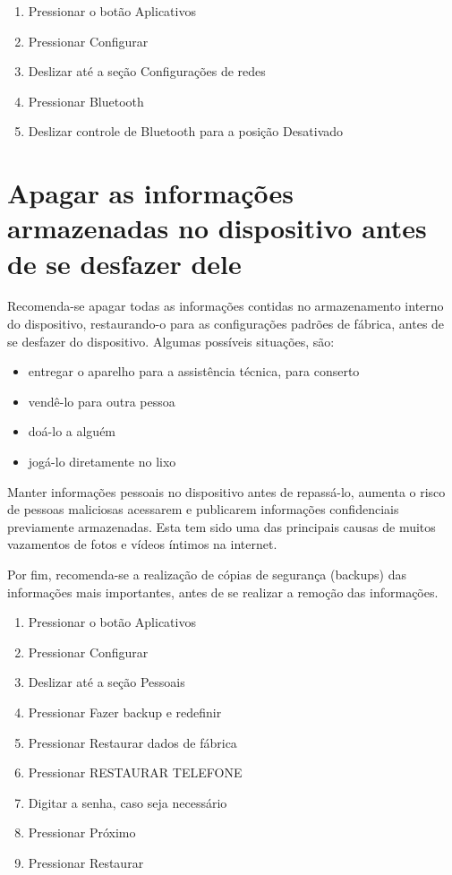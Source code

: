 \begin{enumerate}
\item Pressionar o bot\~ao Aplicativos
\item Pressionar Configurar
\item Deslizar at\'e a se\c c\~ao Configura\c c\~oes de redes
\item Pressionar Bluetooth
\item Deslizar controle de Bluetooth para a posi\c c\~ao Desativado
\end{enumerate}

\section{Apagar as informa\c c\~oes armazenadas no dispositivo antes de se desfazer dele}

Recomenda-se apagar todas as informa\c c\~oes contidas no armazenamento interno do dispositivo, restaurando-o para as configura\c c\~oes padr\~oes de f\'abrica, antes de se desfazer do dispositivo. Algumas poss\'iveis situa\c c\~oes, s\~ao:

\begin{itemize}
\item entregar o aparelho para a assist\^encia t\'ecnica, para conserto
\item vend\^e-lo para outra pessoa
\item do\'a-lo a algu\'em
\item jog\'a-lo diretamente no lixo
\end{itemize}

Manter informa\c c\~oes pessoais no dispositivo antes de repass\'a-lo, aumenta o risco de pessoas maliciosas acessarem e publicarem informa\c c\~oes confidenciais previamente armazenadas. Esta tem sido uma das principais causas de muitos vazamentos de fotos e v\'ideos \'intimos na internet. 

Por fim, recomenda-se a realiza\c c\~ao de c\'opias de seguran\c ca (backups) das informa\c c\~oes mais importantes, antes de se realizar a remo\c c\~ao das informa\c c\~oes.

\begin{enumerate}
\item Pressionar o bot\~ao Aplicativos
\item Pressionar Configurar
\item Deslizar at\'e a se\c c\~ao Pessoais
\item Pressionar Fazer backup e redefinir
\item Pressionar Restaurar dados de f\'abrica
\item Pressionar RESTAURAR TELEFONE
\item Digitar a senha, caso seja necess\'ario
\item Pressionar Pr\'oximo
\item Pressionar Restaurar
\end{enumerate}

